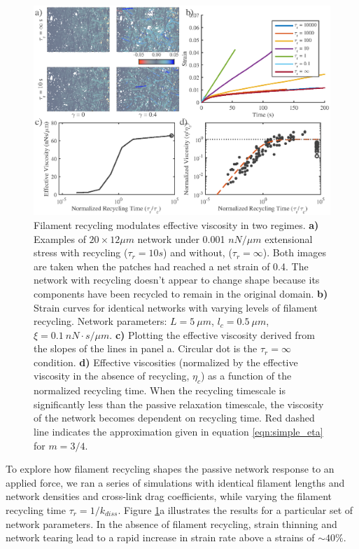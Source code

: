 \documentclass[10pt,letterpaper]{article}
\begin{document}
\begin{figure}[h!]
	\centering
	\includegraphics[width=\hsize]{figures/figure4}
	\caption{\label{fig:passive_rec}  Filament recycling modulates effective viscosity in two regimes. \textbf{a)} Examples of $20 \times 12 \mu m$ network under 0.001 $nN/\mu m$ extensional stress with recycling ($\tau_r=10 s$) and without, ($\tau_r=\infty$).  Both images are taken when the patches had reached a net strain of 0.4.  The network with recycling doesn't appear to change shape because its components have been recycled to remain in the original domain. \textbf{b)} Strain curves for identical networks with varying levels of filament recycling.  Network parameters: $L=5\: \mu m$, $l_c=0.5\: \mu m$, $\xi=0.1\: nN\cdot s/\mu m$. \textbf{c)}  Plotting the effective viscosity derived from the slopes of the lines in panel a.  Circular dot is the $\tau_r=\infty$ condition.  \textbf{d)} Effective viscosities (normalized by the effective viscosity in the absence of recycling, $\eta_c$) as a function of the normalized recycling time. When the recycling timescale is significantly less than the passive relaxation timescale, the viscosity of the network becomes dependent on recycling time. Red dashed line indicates the approximation given in equation \ref{eqn:simple_eta} for $m=3/4$.}
\end{figure}

To explore how filament recycling shapes the passive network response to an applied force, we ran a series of simulations with identical filament lengths and network densities and cross-link drag coefficients, while varying the filament recycling time $\tau_r=1/k_{diss}$. Figure \ref{fig:passive_rec}a illustrates the results for a particular set of network parameters. In the absence of filament recycling, strain thinning and network tearing lead to a rapid increase in strain rate above a strains of $\sim40\%$. 
\end{document}
